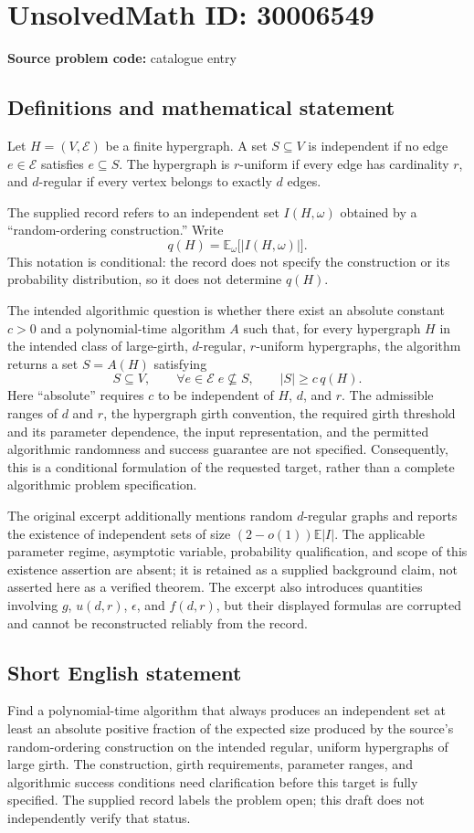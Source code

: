 \documentclass[11pt]{article}
\begin{document}
\section*{UnsolvedMath ID: 30006549}
\textbf{Source problem code:} catalogue entry
\subsection{Definitions and mathematical statement}
Let \(H=(V,\mathcal E)\) be a finite hypergraph. A set \(S\subseteq V\) is independent if no edge \(e\in\mathcal E\) satisfies \(e\subseteq S\). The hypergraph is \(r\)-uniform if every edge has cardinality \(r\), and \(d\)-regular if every vertex belongs to exactly \(d\) edges.

The supplied record refers to an independent set \(I(H,\omega)\) obtained by a ``random-ordering construction.'' Write
\[
q(H)=\mathbb E_{\omega}\bigl[|I(H,\omega)|\bigr].
\]
This notation is conditional: the record does not specify the construction or its probability distribution, so it does not determine \(q(H)\).

The intended algorithmic question is whether there exist an absolute constant \(c>0\) and a polynomial-time algorithm \(A\) such that, for every hypergraph \(H\) in the intended class of large-girth, \(d\)-regular, \(r\)-uniform hypergraphs, the algorithm returns a set \(S=A(H)\) satisfying
\[
S\subseteq V,\qquad
\forall e\in\mathcal E\; e\nsubseteq S,
\qquad
|S|\ge c\,q(H).
\]
Here ``absolute'' requires \(c\) to be independent of \(H\), \(d\), and \(r\). The admissible ranges of \(d\) and \(r\), the hypergraph girth convention, the required girth threshold and its parameter dependence, the input representation, and the permitted algorithmic randomness and success guarantee are not specified. Consequently, this is a conditional formulation of the requested target, rather than a complete algorithmic problem specification.

The original excerpt additionally mentions random \(d\)-regular graphs and reports the existence of independent sets of size \((2-o(1))\mathbb E|I|\). The applicable parameter regime, asymptotic variable, probability qualification, and scope of this existence assertion are absent; it is retained as a supplied background claim, not asserted here as a verified theorem. The excerpt also introduces quantities involving \(g\), \(u(d,r)\), \(\epsilon\), and \(f(d,r)\), but their displayed formulas are corrupted and cannot be reconstructed reliably from the record.
\subsection{Short English statement}
Find a polynomial-time algorithm that always produces an independent set at least an absolute positive fraction of the expected size produced by the source's random-ordering construction on the intended regular, uniform hypergraphs of large girth. The construction, girth requirements, parameter ranges, and algorithmic success conditions need clarification before this target is fully specified. The supplied record labels the problem open; this draft does not independently verify that status.
\end{document}
